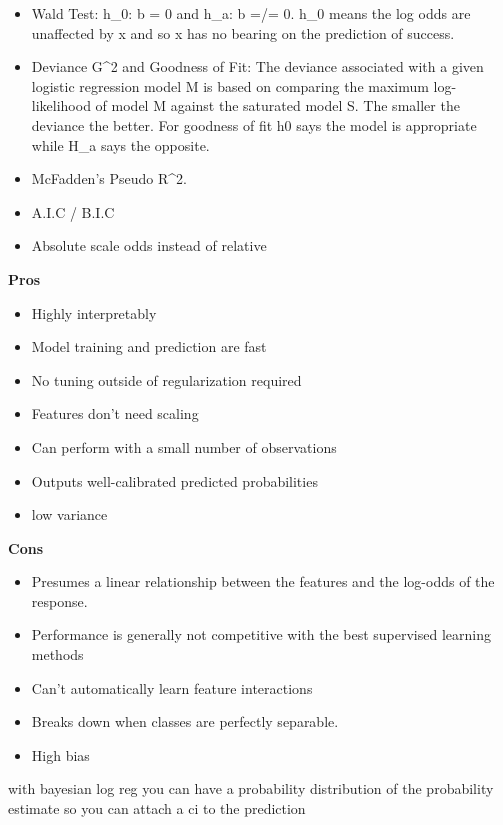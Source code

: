\documentclass[]{book}
\begin{document}
\begin{itemize}
\item
  Wald Test: h\_0: b = 0 and h\_a: b =/= 0. h\_0 means the log odds are unaffected by x and so x has no bearing on the prediction of success.
\item
  Deviance G\^{}2 and Goodness of Fit: The deviance associated with a given logistic regression model M is based on comparing the maximum log-likelihood of model M against the saturated model S. The smaller the deviance the better. For goodness of fit h0 says the model is appropriate while H\_a says the opposite.
\item
  McFadden's Pseudo R\^{}2.
\item
  A.I.C / B.I.C
\item
  Absolute scale odds instead of relative
\end{itemize}

\textbf{Pros}

\begin{itemize}
\item
  Highly interpretably
\item
  Model training and prediction are fast
\item
  No tuning outside of regularization required
\item
  Features don't need scaling
\item
  Can perform with a small number of observations
\item
  Outputs well-calibrated predicted probabilities
\item
  low variance
\end{itemize}

\textbf{Cons}

\begin{itemize}
\item
  Presumes a linear relationship between the features and the log-odds of the response.
\item
  Performance is generally not competitive with the best supervised learning methods
\item
  Can't automatically learn feature interactions
\item
  Breaks down when classes are perfectly separable.
\item
  High bias
\end{itemize}

with bayesian log reg you can have a probability distribution of the probability estimate so you can attach a ci to the prediction
\end{document}
